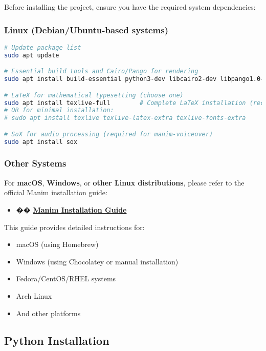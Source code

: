 \documentclass[12pt,a4paper]{article}
\begin{document}
Before installing the project, ensure you have the required system dependencies:

\subsubsection{Linux (Debian/Ubuntu-based systems)}

\begin{lstlisting}[language=bash]
# Update package list
sudo apt update

# Essential build tools and Cairo/Pango for rendering
sudo apt install build-essential python3-dev libcairo2-dev libpango1.0-dev

# LaTeX for mathematical typesetting (choose one)
sudo apt install texlive-full        # Complete LaTeX installation (recommended)
# OR for minimal installation:
# sudo apt install texlive texlive-latex-extra texlive-fonts-extra

# SoX for audio processing (required for manim-voiceover)
sudo apt install sox
\end{lstlisting}

\subsubsection{Other Systems}

For \textbf{macOS}, \textbf{Windows}, or \textbf{other Linux distributions}, please refer to the official Manim installation guide:
\begin{itemize}
    \item �� \href{https://docs.manim.community/en/stable/installation.html}{\textbf{Manim Installation Guide}}
\end{itemize}

This guide provides detailed instructions for:
\begin{itemize}
    \item macOS (using Homebrew)
    \item Windows (using Chocolatey or manual installation)
    \item Fedora/CentOS/RHEL systems
    \item Arch Linux
    \item And other platforms
\end{itemize}

\subsection{Python Installation}
\end{document}
